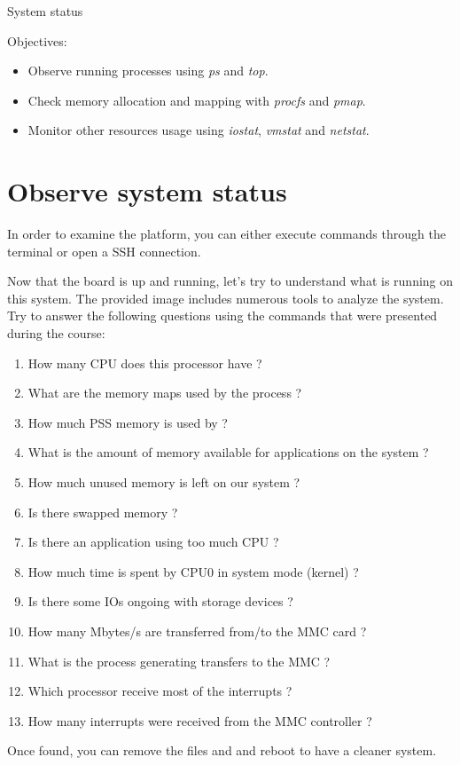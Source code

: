 \subchapter
{System status}
{Objectives:
  \begin{itemize}
    \item Observe running processes using {\em ps} and {\em top}.
    \item Check memory allocation and mapping with {\em procfs} and {\em pmap}.
    \item Monitor other resources usage using {\em iostat}, {\em vmstat} and {\em netstat}.
  \end{itemize}
}

\section{Observe system status}

In order to examine the platform, you can either execute commands through the
 terminal or open a SSH connection.

Now that the board is up and running, let's try to understand what is running
on this system. The provided image includes numerous tools to analyze the
system. Try to answer the following questions using the commands that were
presented during the course:

\begin{enumerate}
  \item How many CPU does this processor have ?
  \item What are the memory maps used by the  process ?
  \item How much PSS memory is used by  ?
  \item What is the amount of memory available for applications on the system ?
  \item How much unused memory is left on our system ?
  \item Is there swapped memory ?
  \item Is there an application using too much CPU ?
  \item How much time is spent by CPU0 in system mode (kernel) ?
  \item Is there some IOs ongoing with storage devices ?
  \item How many Mbytes/s are transferred from/to the MMC card ?
  \item What is the process generating transfers to the MMC ?
  \item Which processor receive most of the interrupts ?
  \item How many interrupts were received from the MMC controller ?
\end{enumerate}

Once found, you can remove the files  and
 and reboot to have a cleaner system.
